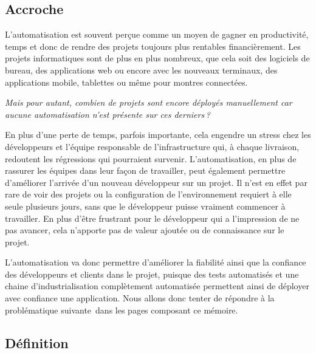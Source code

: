 
\subsection*{Accroche}

L'automatisation est souvent perçue comme un moyen de gagner en productivité, temps et donc de rendre des projets toujours plus rentables financièrement. Les projets informatiques sont de plus en plus nombreux, que cela soit des logiciels de bureau, des applications web ou encore avec les nouveaux terminaux, des applications mobile, tablettes ou même pour montres connectées.
	
\emph{Mais pour autant, combien de projets sont encore déployés manuellement car aucune automatisation n'est présente sur ces derniers ?}
	
En plus d'une perte de temps, parfois importante, cela engendre un stress chez les développeurs et l'équipe responsable de l'infrastructure qui, à chaque livraison, redoutent les régressions qui pourraient survenir. L'automatisation, en plus de rassurer les équipes dans leur façon de travailler, peut également permettre d'améliorer l'arrivée d'un nouveau développeur sur un projet. Il n'est en effet par rare de voir des projets ou la configuration de l'environnement requiert à elle seule plusieurs jours, sans que le développeur puisse vraiment commencer à travailler. En plus d'être frustrant pour le développeur qui a l'impression de ne pas avancer, cela n'apporte pas de valeur ajoutée ou de connaissance sur le projet.

L'automatisation va donc permettre d'améliorer la fiabilité ainsi que la confiance des développeurs et clients dans le projet, puisque des tests automatisés et une chaine d'industrialisation complètement automatisée permettent ainsi de déployer avec confiance une application. Nous allons donc tenter de répondre à la problématique suivante dans les pages composant ce mémoire.

\hrulefill

{\Large \problematique}

\hrulefill

\subsection*{Définition}

